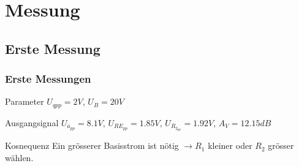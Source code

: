 \section{Messung}

\subsection{Erste Messung}

\begin{frame}
	\frametitle{Erste Messungen}
	\begin{block}{Parameter}
	$U_{qpp} = 2V$, $U_B = 20V$
	\end{block}

	\begin{block}{Ausgangsignal}
	$U_{a_{pp}} = 8.1V$, $U_{RE_{pp}} = 1.85V$, $U_{R_{2_{pp}}} = 1.92V$,
	$A_V = 12.15dB$
	\end{block}

	\begin{alertblock}{Kosnequenz}
	Ein grösserer Basisstrom ist nötig $\rightarrow R_1$ kleiner oder 
	$R_2$ grösser wählen.
	\end{alertblock}	
	
\end{frame}
